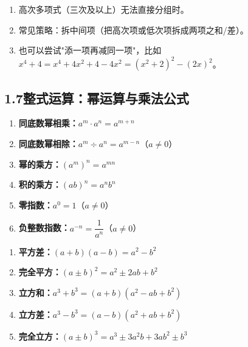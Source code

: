\documentclass[12pt, a4paper]{ctexart}
\begin{document}
\begin{tipbox}[什么时候用拆项添项？]
\begin{enumerate}[leftmargin=18pt]
\item 高次多项式（三次及以上）无法直接分组时。
\item 常见策略：拆中间项（把高次项或低次项拆成两项之和/差）。
\item 也可以尝试"添一项再减同一项"，比如 $x^4+4 = x^4+4x^2+4-4x^2 = (x^2+2)^2-(2x)^2$。
\end{enumerate}
\end{tipbox}

\subsection*{1.7\quad 整式运算：幂运算与乘法公式}

\begin{knowledgebox}[幂运算法则]
\begin{enumerate}[leftmargin=18pt]
\item \textbf{同底数幂相乘：}\quad $a^m \cdot a^n = a^{m+n}$
\item \textbf{同底数幂相除：}\quad $a^m \div a^n = a^{m-n}$\quad（$a \neq 0$）
\item \textbf{幂的乘方：}\quad $(a^m)^n = a^{mn}$
\item \textbf{积的乘方：}\quad $(ab)^n = a^n b^n$
\item \textbf{零指数：}\quad $a^0 = 1$\quad（$a \neq 0$）
\item \textbf{负整数指数：}\quad $a^{-n} = \dfrac{1}{a^n}$\quad（$a \neq 0$）
\end{enumerate}
\end{knowledgebox}

\begin{knowledgebox}[常用乘法公式汇总]
\begin{enumerate}[leftmargin=18pt]
\item \textbf{平方差：}\quad $(a+b)(a-b) = a^2 - b^2$
\item \textbf{完全平方：}\quad $(a \pm b)^2 = a^2 \pm 2ab + b^2$
\item \textbf{立方和：}\quad $a^3 + b^3 = (a+b)(a^2 - ab + b^2)$
\item \textbf{立方差：}\quad $a^3 - b^3 = (a-b)(a^2 + ab + b^2)$
\item \textbf{完全立方：}\quad $(a \pm b)^3 = a^3 \pm 3a^2b + 3ab^2 \pm b^3$
\end{enumerate}
\end{knowledgebox}
\end{document}

